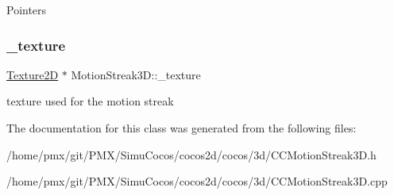 Pointers \mbox{\label{classMotionStreak3D_abd22c4ad88b80e8c7b9ae52366e6c662}} 
\subsubsection{\texorpdfstring{\+\_\+texture}{\_texture}}
{\footnotesize\ttfamily \hyperlink{classTexture2D}{Texture2D} $\ast$ Motion\+Streak3\+D\+::\+\_\+texture\hspace{0.3cm}{\ttfamily [protected]}}

texture used for the motion streak 

The documentation for this class was generated from the following files\+:\begin{DoxyCompactItemize}
\item 
/home/pmx/git/\+P\+M\+X/\+Simu\+Cocos/cocos2d/cocos/3d/C\+C\+Motion\+Streak3\+D.\+h\item 
/home/pmx/git/\+P\+M\+X/\+Simu\+Cocos/cocos2d/cocos/3d/C\+C\+Motion\+Streak3\+D.\+cpp\end{DoxyCompactItemize}
